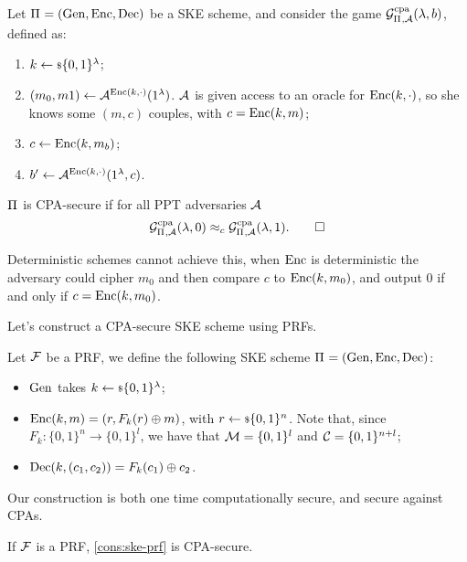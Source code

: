 \begin{definition}
	Let $\Pi_{} = \left( \mathrm{Gen} , \allowbreak \mathrm{Enc} , \allowbreak \mathrm{Dec} \right)$ be a \ac{SKE} scheme, and consider the game $\mathcal{G}^{\scriptstyle \text{cpa}}_{\Pi_{},\mathcal{A}}(\lambda, b)$, defined as:
	\begin{enumerate}
		\item $k \leftarrow {\scriptstyle \$} {\{0,1\}^{\lambda}}$;
		\item $(m_0, m1) \leftarrow \mathcal{A}^{\mathrm{Enc}(k, \cdot)} (1^{\lambda})$.
			$\mathcal{A}$ is given access to an oracle for $\mathrm{Enc}(k, \cdot)$, so she knows some $(m,c)$ couples, with $c = \mathrm{Enc}(k, m)$;
		\item $c \leftarrow \mathrm{Enc}(k, m_b)$;
		\item $b' \leftarrow \mathcal{A}^{\mathrm{Enc}(k, \cdot)}(1^{\lambda}, c)$.
	\end{enumerate}

	$\Pi_{}$ is \ac{CPA}-secure if for all \ac{PPT} adversaries $\mathcal{A}$
	\begin{equation*}
		\mathcal{G}^{\scriptstyle \text{cpa}}_{\Pi_{},\mathcal{A}}(\lambda, 0) \approx_c \mathcal{G}^{\scriptstyle \text{cpa}}_{\Pi_{},\mathcal{A}}(\lambda, 1). \qedhere
	\end{equation*}
\end{definition}

Deterministic schemes cannot achieve this, \ie when $\mathrm{Enc}$ is deterministic the adversary could cipher $m_0$ and then compare $c$ to $\mathrm{Enc}(k, m_0)$, and output $0$ if and only if $c = \mathrm{Enc}(k, m_0)$.

Let's construct a \ac{CPA}-secure \ac{SKE} scheme using \acp{PRF}.
\begin{construction} \label{cons:ske-prf}
	Let $\mathcal{F}$ be a \ac{PRF}, we define the following \ac{SKE} scheme $\Pi_{} = \left( \mathrm{Gen} , \allowbreak \mathrm{Enc} , \allowbreak \mathrm{Dec} \right)$:
	\begin{itemize}
		\item $\mathrm{Gen}$ takes $k \leftarrow {\scriptstyle \$} {\{0,1\}^{\lambda}}$;
		\item $\mathrm{Enc}(k,m) = (r, F_k(r) \oplus m)$, with $r \leftarrow {\scriptstyle \$} {\{0,1\}^{n}}$.
			Note that, since $F_k : \{0,1\}^{n} \to \{0,1\}^{l}$, we have that $\mathcal{M} = \{0,1\}^{l}$ and $\mathcal{C} = \{0,1\}^{n+l}$;
		\item $\mathrm{Dec}(k, (c_1, c_2)) = F_k(c_1) \oplus c_2$. \qedhere
	\end{itemize}
\end{construction}

Our construction is both one time computationally secure, and secure against \acp{CPA}.
\begin{theorem} \label{thm:ske-prf-cpa}
	If $\mathcal{F}$ is a \ac{PRF}, \cref{cons:ske-prf} is \ac{CPA}-secure.
\end{theorem}

